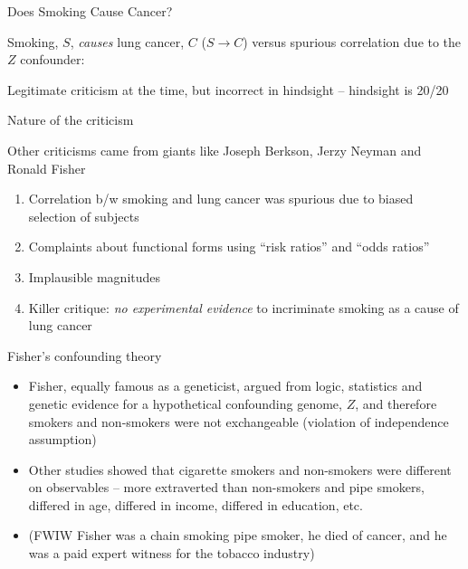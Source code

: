 \documentclass{beamer}
\begin{document}
	
\begin{frame}{Does Smoking Cause Cancer?}
	
  Smoking, $S$, \emph{causes} lung cancer, $C$ ($S \rightarrow C$) versus spurious correlation due to the $Z$ confounder:

  \begin{center}
  \end{center}

Legitimate criticism at the time, but incorrect in hindsight -- hindsight is 20/20
	
\end{frame}


\begin{frame}{Nature of the criticism}

Other criticisms came from giants like Joseph Berkson, Jerzy Neyman and Ronald Fisher
		\begin{enumerate}
		\item Correlation b/w smoking and lung cancer was spurious due to biased selection of subjects
		\item Complaints about functional forms using ``risk ratios'' and ``odds ratios''
		\item Implausible magnitudes
		\item Killer critique: \emph{no experimental evidence} to incriminate smoking as a cause of lung cancer
		\end{enumerate}
\end{frame}

\begin{frame}{Fisher's confounding theory}
		\begin{itemize}
		\item Fisher, equally famous as a geneticist, argued from logic, statistics and genetic evidence for a hypothetical confounding genome, $Z$, and therefore smokers and non-smokers were not exchangeable (violation of independence assumption)
		\item Other studies showed that cigarette smokers and non-smokers were different on observables -- more extraverted than non-smokers and pipe smokers, differed in age, differed in income, differed in education, etc.
		\item (FWIW Fisher was a chain smoking pipe smoker, he died of cancer, and he was a paid expert witness for the tobacco industry)
		\end{itemize}
\end{frame}
\end{document}
